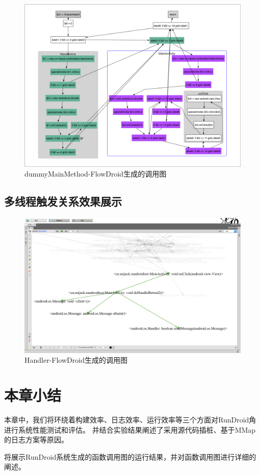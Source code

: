 \begin{figure}[ht]
	\centering
	\includegraphics[height=0.45\textheight]{./Figures/flowdroid-dummyMainMethod.png}
	\caption{dummyMainMethod-FlowDroid生成的调用图}
	\label{fig:flowdroid-result-lifecycle}
\end{figure}


\subsection{多线程触发关系效果展示}

\begin{figure}[ht]
	\centering
	\includegraphics[width=\textwidth]{./Figures/FlowDroid-handler.png}
	\caption{Handler-FlowDroid生成的调用图}
	\label{fig:flowdroid-result-handler}
\end{figure}
 \section{本章小结}
 
 本章中，我们将环绕着构建效率、日志效率、运行效率等三个方面对RunDroid角进行系统性能测试和评估。
 并结合实验结果阐述了采用源代码插桩、基于MMap的日志方案等原因。
 
 将展示RunDroid系统生成的函数调用图的运行结果，并对函数调用图进行详细的阐述。
